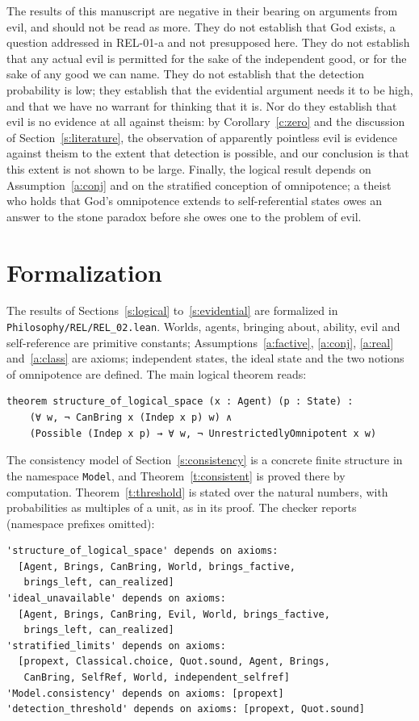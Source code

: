 \documentclass{situationist-preprint}
\begin{document}
The results of this manuscript are negative in their bearing on arguments from evil, and should not be read as more. They do not establish that God exists, a question addressed in REL-01-a and not presupposed here. They do not establish that any actual evil is permitted for the sake of the independent good, or for the sake of any good we can name. They do not establish that the detection probability is low; they establish that the evidential argument needs it to be high, and that we have no warrant for thinking that it is. Nor do they establish that evil is no evidence at all against theism: by Corollary~\ref{c:zero} and the discussion of Section~\ref{s:literature}, the observation of apparently pointless evil is evidence against theism to the extent that detection is possible, and our conclusion is that this extent is not shown to be large. Finally, the logical result depends on Assumption~\ref{a:conj} and on the stratified conception of omnipotence; a theist who holds that God's omnipotence extends to self-referential states owes an answer to the stone paradox before she owes one to the problem of evil.

\section{Formalization}\label{s:formal}

The results of Sections~\ref{s:logical} to~\ref{s:evidential} are formalized in \nolinkurl{Philosophy/REL/REL_02.lean}. Worlds, agents, bringing about, ability, evil and self-reference are primitive constants; Assumptions~\ref{a:factive}, \ref{a:conj}, \ref{a:real} and~\ref{a:class} are axioms; independent states, the ideal state and the two notions of omnipotence are defined. The main logical theorem reads:

\begin{lstlisting}
theorem structure_of_logical_space (x : Agent) (p : State) :
    (∀ w, ¬ CanBring x (Indep x p) w) ∧
    (Possible (Indep x p) → ∀ w, ¬ UnrestrictedlyOmnipotent x w)
\end{lstlisting}

The consistency model of Section~\ref{s:consistency} is a concrete finite structure in the namespace \texttt{Model}, and Theorem~\ref{t:consistent} is proved there by computation. Theorem~\ref{t:threshold} is stated over the natural numbers, with probabilities as multiples of a unit, as in its proof. The checker reports (namespace prefixes omitted):

\begin{lstlisting}
'structure_of_logical_space' depends on axioms:
  [Agent, Brings, CanBring, World, brings_factive,
   brings_left, can_realized]
'ideal_unavailable' depends on axioms:
  [Agent, Brings, CanBring, Evil, World, brings_factive,
   brings_left, can_realized]
'stratified_limits' depends on axioms:
  [propext, Classical.choice, Quot.sound, Agent, Brings,
   CanBring, SelfRef, World, independent_selfref]
'Model.consistency' depends on axioms: [propext]
'detection_threshold' depends on axioms: [propext, Quot.sound]
\end{lstlisting}
\end{document}
